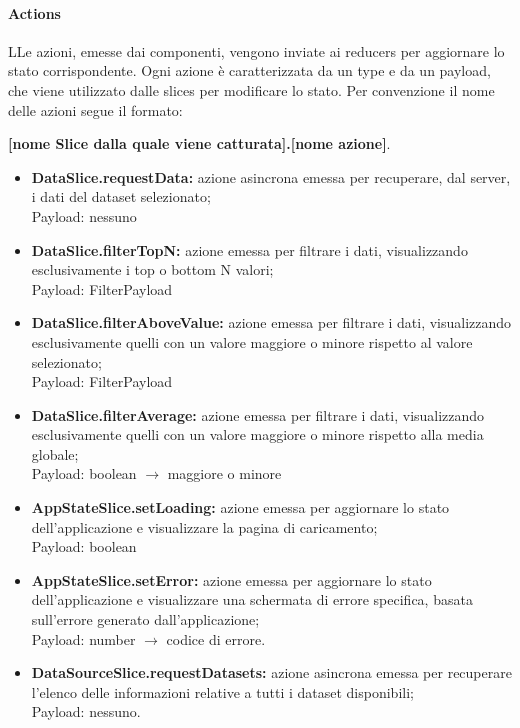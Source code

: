 \paragraph{Actions}
    LLe azioni, emesse dai componenti, vengono inviate ai reducers per aggiornare lo stato corrispondente.
    Ogni azione è caratterizzata da un type e da un payload, che viene utilizzato dalle slices per modificare lo stato.
    Per convenzione il nome delle azioni segue il formato: \\
    \begin{center}
        \textbf{[nome Slice dalla quale viene catturata].[nome azione]}.
    \end{center}
    \begin{itemize}
        \item \textbf{DataSlice.requestData:} azione asincrona emessa per recuperare, dal server, i dati del dataset selezionato; \\ Payload: nessuno
        \item \textbf{DataSlice.filterTopN:} azione emessa per filtrare i dati, visualizzando esclusivamente i top o bottom N valori; \\ Payload: FilterPayload
        \item \textbf{DataSlice.filterAboveValue:} azione emessa per filtrare i dati, visualizzando esclusivamente quelli con un valore maggiore o minore rispetto al valore selezionato;\\ Payload: FilterPayload
        \item \textbf{DataSlice.filterAverage:} azione emessa per filtrare i dati, visualizzando esclusivamente quelli con un valore maggiore o minore rispetto alla media globale; \\ Payload: boolean $\rightarrow$ maggiore o minore
        \item \textbf{AppStateSlice.setLoading:} azione emessa per aggiornare lo stato dell'applicazione e visualizzare la pagina di caricamento; \\ Payload: boolean
        \item \textbf{AppStateSlice.setError:} azione emessa per aggiornare lo stato dell'applicazione e visualizzare una schermata di errore specifica, basata sull'errore generato dall'applicazione; \\ Payload: number $\rightarrow$ codice di errore.
        \item \textbf{DataSourceSlice.requestDatasets:} azione asincrona emessa per recuperare l'elenco delle informazioni relative a tutti i dataset disponibili; \\ Payload: nessuno.

\end{itemize}
